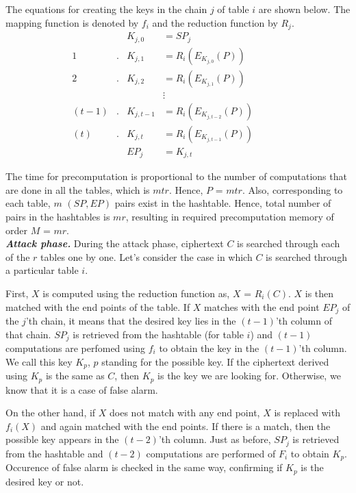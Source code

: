 The equations for creating the keys in the chain $j$ of table $i$ are shown below. The mapping function is denoted by $f_i$ and the reduction function by $R_j$.
\begin{align*}
& & K_{j,0} & = SP_j & & & &\\
1&. &K_{j,1} & = R_i(E_{K_{j,0}}(P)) & & & &\\
2&. &K_{j,2} & = R_i(E_{K_{j,1}}(P)) & & & &\\
& & &\vdots & & & &\\
(t-1)&. &K_{j,t-1} & = R_i(E_{K_{j,t-2}}(P)) & & & &\\
(t)&. &K_{j,t} & = R_i(E_{K_{j,t-1}}(P)) & & & &\\
& & EP_j & = K_{j,t} & & & &
\end{align*}

The time for precomputation is proportional to the number of computations that are done in all the tables, which is $mtr$. Hence, $P$ = $mtr$. Also, corresponding to each table, $m$ $(SP, EP)$ pairs exist in the hashtable. Hence, total number of pairs in the hashtables is $mr$, resulting in required precomputation memory of order $M$ = $mr$.\\

\noindent \textit{\textbf{Attack phase.}} During the attack phase, ciphertext $C$ is searched through each of the $r$ tables one by one. Let's consider the case in which $C$ is searched through a particular table $i$. 

First, $X$ is computed using the reduction function as, $X$ = $R_i(C)$. $X$ is then matched with the end points of the table. If $X$ matches with the end point $EP_{j}$ of the $j$'th chain, it means that the desired key lies in the $(t-1)$'th column of that chain. $SP_{j}$ is retrieved from the hashtable (for table $i$) and $(t-1)$ computations are perfomed using $f_i$ to obtain the key in the $(t-1)$'th column. We call this key $K_p$, $p$ standing for the possible key. If the ciphertext derived using $K_p$ is the same as $C$, then $K_p$ is the key we are looking for. Otherwise, we know that it is a case of false alarm. 

On the other hand, if $X$ does not match with any end point, $X$ is replaced with $f_i(X)$ and again matched with the end points. If there is a match, then the possible key appears in the $(t-2)$'th column. Just as before, $SP_{j}$ is retrieved from the hashtable and $(t-2)$ computations are performed of $F_i$ to obtain $K_p$. Occurence of false alarm is checked in the same way, confirming if $K_p$ is the desired key or not. 

